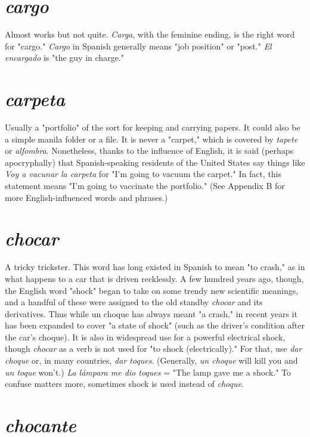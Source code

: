 \documentclass[14pt,a4paper,oneside]{memoir}
\begin{document}
\section{\emph{cargo}}

Almost works but not quite. \emph{Carga}, with the feminine ending, is the right word for "cargo." \emph{Cargo} in Spanish generally
means "job position" or "post." \emph{El encargado} is "the guy in charge."

\section{\emph{carpeta}}

Usually a "portfolio" of the sort for keeping and
carrying papers. It could also be a simple manila folder or a file. It is
never a "carpet," which is covered by \emph{tapete} or \emph{alfombra}. Nonetheless,
thanks to the influence of English, it is said (perhaps apocryphally) that
Spanish-speaking residents of the United States say things like \emph{Voy a
	vacunar la carpeta} for "I'm going to vacuum the carpet." In fact, this
statement means "I'm going to vaccinate the portfolio." (See Appendix
B for more English-influenced words and phrases.)

\section{\emph{chocar}}

A tricky trickster. This word has long existed in
Spanish to mean "to crash," as in what happens to a car that is driven
recklessly. A few hundred years ago, though, the English word "shock"
began to take on some trendy new scientific meanings, and a handful
of these were assigned to the old standby \emph{chocar} and its derivatives.
Thus while un choque has always meant "a crash," in recent years it
has been expanded to cover "a state of shock" (such as the driver's condition after the car's choque). It is also in widespread use for a powerful electrical shock, though \emph{chocar} as a verb is not used for "to shock
(electrically)." For that, use \emph{dar choque} or, in many countries, \emph{dar toques}. (Generally, \emph{un choque} will kill you and \emph{un toque} won't.) \emph{La lámpara me dio toques} = "The lamp gave me a shock." To confuse matters more, sometimes shock is used instead of \emph{choque}.

\section{\emph{chocante}}
\end{document}
